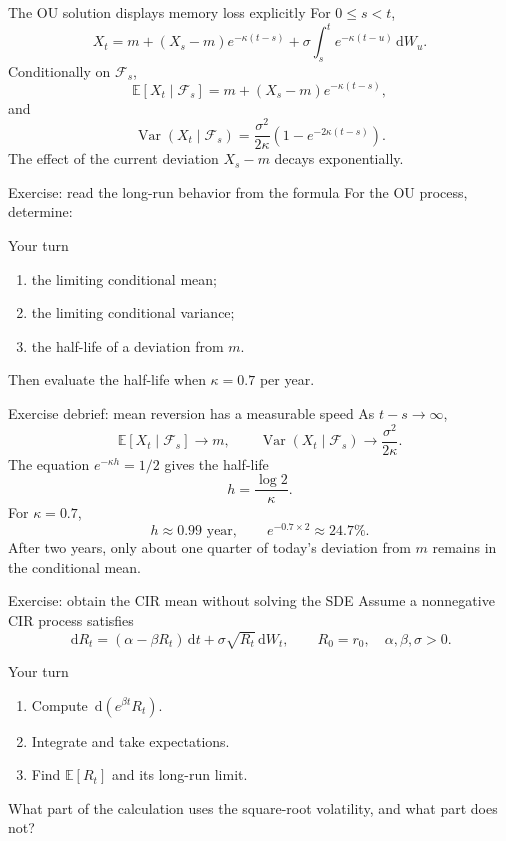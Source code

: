 \documentclass[handout,10pt,aspectratio=169]{beamer}
\newcommand{\E}{\mathbb E}
\newcommand{\F}{\mathcal F}
\newcommand{\dd}{\,\mathrm d}
\DeclareMathOperator{\Var}{Var}
\begin{document}
\begin{frame}{The OU solution displays memory loss explicitly}
For \(0\le s<t\),
\[
\boxed{
X_t=m+(X_s-m)e^{-\kappa(t-s)}
+\sigma\int_s^t e^{-\kappa(t-u)}\dd W_u.}
\]
Conditionally on \(\F_s\),
\[
\E[X_t\mid\F_s]=m+(X_s-m)e^{-\kappa(t-s)},
\]
and
\[
\Var(X_t\mid\F_s)
=\frac{\sigma^2}{2\kappa}\left(1-e^{-2\kappa(t-s)}\right).
\]
The effect of the current deviation \(X_s-m\) decays exponentially.
\end{frame}

\begin{frame}{Exercise: read the long-run behavior from the formula}
For the OU process, determine:
\begin{block}{Your turn}
\begin{enumerate}\setlength{\itemsep}{0.55em}
  \item the limiting conditional mean;
  \item the limiting conditional variance;
  \item the half-life of a deviation from \(m\).
\end{enumerate}
\end{block}
Then evaluate the half-life when \(\kappa=0.7\) per year.
\end{frame}

\begin{frame}{Exercise debrief: mean reversion has a measurable speed}
As \(t-s\to\infty\),
\[
\E[X_t\mid\F_s]\to m,
\qquad
\Var(X_t\mid\F_s)\to\frac{\sigma^2}{2\kappa}.
\]
The equation \(e^{-\kappa h}=1/2\) gives the half-life
\[
\boxed{h=\frac{\log2}{\kappa}.}
\]
For \(\kappa=0.7\),
\[
h\approx0.99\text{ year},
\qquad
e^{-0.7\times2}\approx24.7\%.
\]
After two years, only about one quarter of today's deviation from \(m\) remains in the conditional mean.
\end{frame}

\begin{frame}{Exercise: obtain the CIR mean without solving the SDE}
Assume a nonnegative CIR process satisfies
\[
\dd R_t=(\alpha-\beta R_t)\dd t+\sigma\sqrt{R_t}\dd W_t,
\qquad R_0=r_0,\quad \alpha,\beta,\sigma>0.
\]
\begin{block}{Your turn}
\begin{enumerate}\setlength{\itemsep}{0.5em}
  \item Compute \(\dd(e^{\beta t}R_t)\).
  \item Integrate and take expectations.
  \item Find \(\E[R_t]\) and its long-run limit.
\end{enumerate}
\end{block}
What part of the calculation uses the square-root volatility, and what part does not?
\end{frame}
\end{document}
